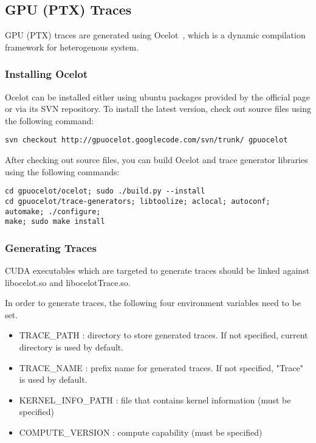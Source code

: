 \subsection{GPU (PTX) Traces}

GPU (PTX) traces are generated using Ocelot~\cite{}, which is a dynamic compilation
framework for heterogenous system. 

\subsubsection{Installing Ocelot}

Ocelot can be installed either using ubuntu packages provided by the official
page or via its SVN repository. To install the latest version, check out 
source files using the following command:

\smallskip
\begin{lstlisting}
svn checkout http://gpuocelot.googlecode.com/svn/trunk/ gpuocelot
\end{lstlisting}
\smallskip

After checking out source files, you can build Ocelot and trace generator libraries using the following commands:

\smallskip
\begin{lstlisting}
cd gpuocelot/ocelot; sudo ./build.py --install
cd gpuocelot/trace-generators; libtoolize; aclocal; autoconf; automake; ./configure; 
make; sudo make install
\end{lstlisting}
\smallskip

\subsubsection{Generating Traces}

CUDA executables which are targeted to generate traces should be linked against
libocelot.so and libocelotTrace.so.

In order to generate traces, the following four environment variables need to be set.

\begin{itemize}\itemsep2pt
\item TRACE\_PATH : directory to store generated traces. If not specified, current directory is used by default.
\item TRACE\_NAME : prefix name for generated traces. If not specified, "Trace" is used by default.
\item KERNEL\_INFO\_PATH : file that contains kernel information (must be specified)
\item COMPUTE\_VERSION : compute capability (must be specified)
\end{itemize}

